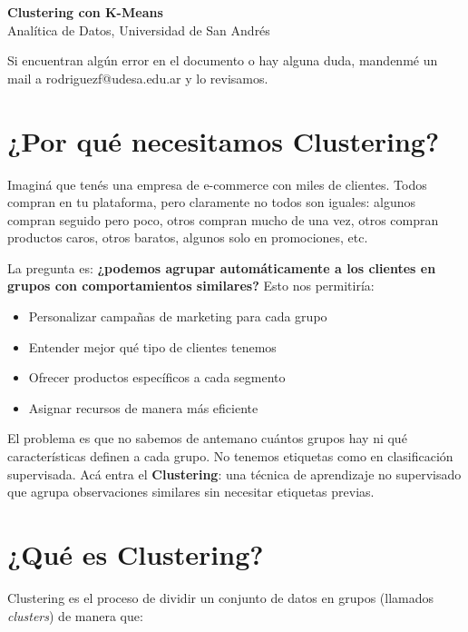 \documentclass[12pt]{article}
\begin{document}
\begin{center}
  {\LARGE \textbf{Clustering con K-Means}}\\[0.5em]
  {Analítica de Datos, Universidad de San Andrés}
\end{center}

\vspace{1em}

Si encuentran algún error en el documento o hay alguna duda, mandenmé un mail a rodriguezf@udesa.edu.ar y lo revisamos.

\section{¿Por qué necesitamos Clustering?}

Imaginá que tenés una empresa de e-commerce con miles de clientes. Todos compran en tu plataforma, pero claramente no todos son iguales: algunos compran seguido pero poco, otros compran mucho de una vez, otros compran productos caros, otros baratos, algunos solo en promociones, etc.

\vspace{0.5em}

La pregunta es: \textbf{¿podemos agrupar automáticamente a los clientes en grupos con comportamientos similares?} Esto nos permitiría:

\begin{itemize}
    \item Personalizar campañas de marketing para cada grupo
    \item Entender mejor qué tipo de clientes tenemos
    \item Ofrecer productos específicos a cada segmento
    \item Asignar recursos de manera más eficiente
\end{itemize}

El problema es que no sabemos de antemano cuántos grupos hay ni qué características definen a cada grupo. No tenemos etiquetas como en clasificación supervisada. Acá entra el \textbf{Clustering}: una técnica de aprendizaje no supervisado que agrupa observaciones similares sin necesitar etiquetas previas.

\section{¿Qué es Clustering?}

Clustering es el proceso de dividir un conjunto de datos en grupos (llamados \textit{clusters}) de manera que:
\end{document}
